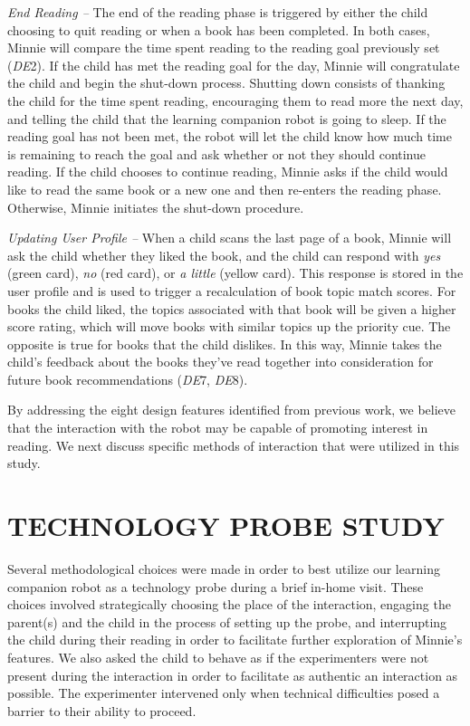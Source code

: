 \documentclass{sigchi}
\begin{document}
\textit{End Reading --} The end of the reading phase is triggered by either the child choosing to quit reading or when a book has been completed. In both cases, Minnie will compare the time spent reading to the reading goal previously set (\textit{DE}2). If the child has met the reading goal for the day, Minnie will congratulate the child and begin the shut-down process. Shutting down consists of thanking the child for the time spent reading, encouraging them to read more the next day, and telling the child that the learning companion robot is going to sleep. If the reading goal has not been met, the robot will let the child know how much time is remaining to reach the goal and ask whether or not they should continue reading. If the child chooses to continue reading, Minnie asks if the child would like to read the same book or a new one and then re-enters the reading phase. Otherwise, Minnie initiates the shut-down procedure. 

\textit{Updating User Profile --} When a child scans the last page of a book, Minnie will ask the child whether they liked the book, and the child can respond with \textit{yes} (green card), \textit{no} (red card), or \textit{a little} (yellow card). This response is stored in the user profile and is used to trigger a recalculation of book topic match scores. For books the child liked, the topics associated with that book will be given a higher score rating, which will move books with similar topics up the priority cue. The opposite is true for books that the child dislikes. In this way, Minnie takes the child's feedback about the books they've read together into consideration for future book recommendations (\textit{DE}7, \textit{DE}8).

By addressing the eight design features identified from previous work, we believe that the interaction with the robot may be capable of promoting interest in reading. We next discuss specific methods of interaction that were utilized in this study.

\section{TECHNOLOGY PROBE STUDY}
Several methodological choices were made in order to best utilize our learning companion robot as a technology probe during a brief in-home visit. These choices involved strategically choosing the place of the interaction, engaging the parent(s) and the child in the process of setting up the probe, and interrupting the child during their reading in order to facilitate further exploration of Minnie's features. We also asked the child to behave as if the experimenters were not present during the interaction in order to facilitate as authentic an interaction as possible. The experimenter intervened only when technical difficulties posed a barrier to their ability to proceed.
\end{document}
